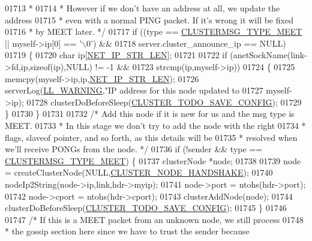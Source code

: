 \begin{DoxyCode}
{{{{{{{{{{{{{{{{{{{{{{{{{01713 \textcolor{comment}{         *}
01714 \textcolor{comment}{         * However if we don't have an address at all, we update the address}
01715 \textcolor{comment}{         * even with a normal PING packet. If it's wrong it will be fixed}
01716 \textcolor{comment}{         * by MEET later. */}
01717         \textcolor{keywordflow}{if} ((type == \hyperlink{cluster_8h_aaf264f57ae1869c57093fd9fbc6fc5bc}{CLUSTERMSG\_TYPE\_MEET} || myself->ip[0] == \textcolor{stringliteral}{'\(\backslash\)0'}) &&
01718             server.cluster\_announce\_ip == NULL)
01719         \{
01720             \textcolor{keywordtype}{char} ip[\hyperlink{server_8h_ad97c5405ed22a94e9fcc10fba577d6c0}{NET\_IP\_STR\_LEN}];
01721 
01722             \textcolor{keywordflow}{if} (anetSockName(link->fd,ip,\textcolor{keyword}{sizeof}(ip),NULL) != -1 &&
01723                 strcmp(ip,myself->ip))
01724             \{
01725                 memcpy(myself->ip,ip,\hyperlink{server_8h_ad97c5405ed22a94e9fcc10fba577d6c0}{NET\_IP\_STR\_LEN});
01726                 serverLog(\hyperlink{server_8h_a31229b9334bba7d6be2a72970967a14b}{LL\_WARNING},\textcolor{stringliteral}{"IP address for this node updated to %
01727                     myself->ip);
01728                 clusterDoBeforeSleep(\hyperlink{cluster_8h_a0ae5ff08fbae3c655012b4de8bfc327d}{CLUSTER\_TODO\_SAVE\_CONFIG});
01729             \}
01730         \}
01731 
01732         \textcolor{comment}{/* Add this node if it is new for us and the msg type is MEET.}
01733 \textcolor{comment}{         * In this stage we don't try to add the node with the right}
01734 \textcolor{comment}{         * flags, slaveof pointer, and so forth, as this details will be}
01735 \textcolor{comment}{         * resolved when we'll receive PONGs from the node. */}
01736         \textcolor{keywordflow}{if} (!sender && type == \hyperlink{cluster_8h_aaf264f57ae1869c57093fd9fbc6fc5bc}{CLUSTERMSG\_TYPE\_MEET}) \{
01737             clusterNode *node;
01738 
01739             node = createClusterNode(NULL,\hyperlink{cluster_8h_a60571342a067f1e5772a04b36feff6a6}{CLUSTER\_NODE\_HANDSHAKE});
01740             nodeIp2String(node->ip,link,hdr->myip);
01741             node->port = ntohs(hdr->port);
01742             node->cport = ntohs(hdr->cport);
01743             clusterAddNode(node);
01744             clusterDoBeforeSleep(\hyperlink{cluster_8h_a0ae5ff08fbae3c655012b4de8bfc327d}{CLUSTER\_TODO\_SAVE\_CONFIG});
01745         \}
01746 
01747         \textcolor{comment}{/* If this is a MEET packet from an unknown node, we still process}
01748 \textcolor{comment}{         * the gossip section here since we have to trust the sender because}
}}}}}}}}}}}}}}}}}}}}}}}}}}
\end{DoxyCode}
